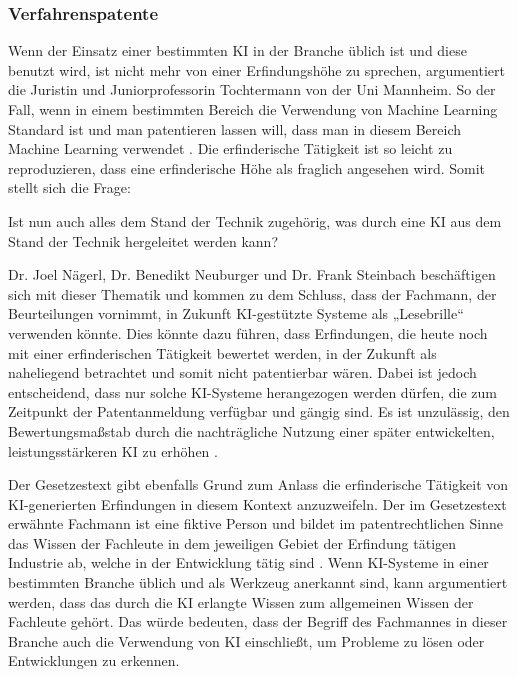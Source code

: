\subsubsection{Verfahrenspatente}

Wenn der Einsatz einer bestimmten KI in der Branche üblich ist 
und diese benutzt wird,
ist nicht mehr von einer Erfindungshöhe zu sprechen, argumentiert
die Juristin und Juniorprofessorin Tochtermann von der Uni Mannheim.
So der Fall, wenn in einem bestimmten Bereich die Verwendung von
Machine Learning Standard ist und man patentieren lassen will,
dass man in diesem Bereich Machine Learning verwendet \cite{WieManPatente2021}.
Die erfinderische Tätigkeit ist so leicht zu reproduzieren,
dass eine erfinderische Höhe als fraglich angesehen wird.
Somit stellt sich die Frage: 

Ist nun auch alles dem Stand der Technik zugehörig, was durch eine KI aus dem 
Stand der Technik hergeleitet werden kann? 

Dr. Joel Nägerl, Dr. Benedikt Neuburger und Dr. Frank Steinbach beschäftigen
sich mit dieser Thematik und kommen zu dem Schluss,
dass der Fachmann, der Beurteilungen vornimmt, 
in Zukunft KI-gestützte Systeme als „Lesebrille“ verwenden könnte.
Dies könnte dazu führen, dass Erfindungen, 
die heute noch mit einer erfinderischen Tätigkeit bewertet werden, 
in der Zukunft als naheliegend betrachtet und somit nicht patentierbar wären.
Dabei ist jedoch entscheidend, 
dass nur solche KI-Systeme herangezogen werden dürfen, 
die zum Zeitpunkt der Patentanmeldung verfügbar und gängig sind. 
Es ist unzulässig, den Bewertungsmaßstab durch die nachträgliche Nutzung 
einer später entwickelten, leistungsstärkeren KI zu erhöhen 
\cite{nagerlKunstlicheIntelligenzParadigmenwechsel2019}.

Der Gesetzestext gibt ebenfalls Grund zum Anlass die erfinderische 
Tätigkeit von KI-generierten Erfindungen in diesem Kontext anzuzweifeln.
Der im Gesetzestext erwähnte Fachmann ist eine fiktive Person
und bildet im patentrechtlichen Sinne das Wissen der
Fachleute in dem jeweiligen Gebiet der Erfindung tätigen Industrie ab,
welche in der Entwicklung tätig sind \cite{asendorfPatGErfindungAuf2023}.
Wenn KI-Systeme in einer bestimmten Branche üblich 
und als Werkzeug anerkannt sind, kann argumentiert werden, 
dass das durch die KI erlangte Wissen 
zum allgemeinen Wissen der Fachleute gehört. 
Das würde bedeuten, dass der Begriff des Fachmannes
in dieser Branche auch die Verwendung von KI einschließt, 
um Probleme zu lösen oder Entwicklungen zu erkennen.


